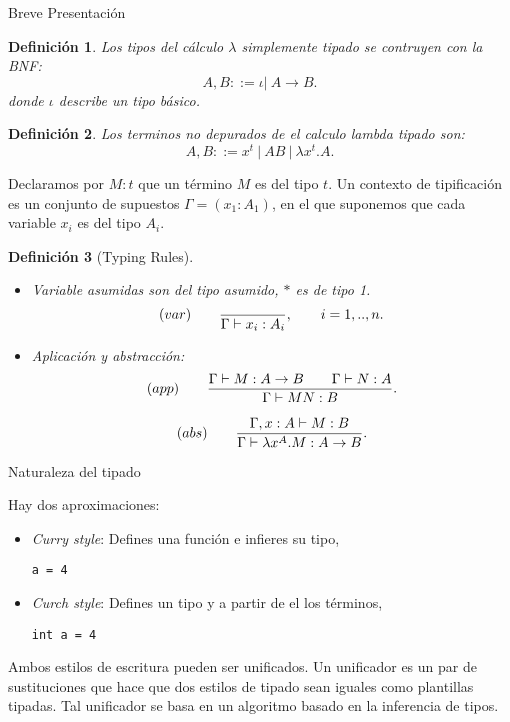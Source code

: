 \documentclass[usenames,dvipsnames]{beamer}
\newtheorem{definicion}{Definición}
\begin{document}
\begin{frame}{Breve Presentación}
  \begin{definicion}
Los tipos del cálculo $\lambda$ simplemente tipado se contruyen con la BNF:
    $$A,B ::= \iota |\ A\to B .$$
donde $\iota$ describe un tipo básico.
  \end{definicion}
\end{frame}
\begin{frame}
  \begin{definicion}
Los terminos no depurados de el calculo lambda tipado son:
    $$A,B ::= x^t\ |\ AB\ |\ \lambda x^t.A .$$
  \end{definicion}

   Declaramos por $M:t$ que un término $M$ es del tipo $t$. Un contexto de tipificación es un conjunto de supuestos $\Gamma = (x_1:A_1)$, en el que suponemos que cada variable $x_i$ es del tipo $A_i$.
\end{frame}

\begin{frame}

  \begin{definicion}[Typing Rules]\label{def:typing-rules}
    \begin{itemize}
    \item  Variable asumidas son del tipo asumido, $*$ es de tipo 1.
      $$  (var)\qquad  {\displaystyle \over \Gamma \vdash x_i:A_i},\qquad  i=  1,..,n.$$

    \item Aplicación y abstracción:
      $$(app)\qquad  {\displaystyle \Gamma \vdash M:A\to B\qquad \Gamma \vdash N:A      \over \Gamma \vdash MN:B}.$$

      $$(abs)\qquad  {\displaystyle \Gamma, x: A\vdash M: B  \over \Gamma \vdash \lambda x^A.M:A\to B}.$$
    \end{itemize}
  \end{definicion}
\end{frame}


\begin{frame}{Naturaleza del tipado}

  Hay dos aproximaciones:
  \begin{itemize}
  \item \emph{Curry style}: Defines una función e infieres su tipo,
    \begin{center}
      \texttt{a = 4}
    \end{center}
  \item \emph{Curch style}: Defines un tipo y a partir de el los términos,
    \begin{center}
      \texttt{int a = 4}
    \end{center}
  \end{itemize}
Ambos estilos de escritura pueden ser unificados. Un unificador es un par de sustituciones que hace que dos estilos de tipado sean iguales como plantillas tipadas. Tal unificador se basa en un algoritmo basado en la inferencia de tipos.
\end{frame}
\end{document}
